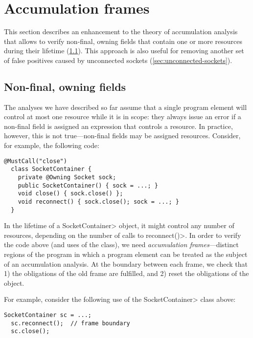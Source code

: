 \section{Accumulation frames}
\label{sec:reset-must-call}

This section describes an enhancement to the theory of accumulation
analysis that allows \tool to verify non-final, owning fields
that contain one or more resources during their lifetime
(\cref{sec:non-final-owning}).
This approach is also useful for
removing another set of false positives caused by unconnected sockets
(\cref{sec:unconnected-sockets}).

\subsection{Non-final, owning fields}
\label{sec:non-final-owning}

The analyses we have described so far assume that a single program
element will control at most one resource while it is in scope:
they always issue an error if a non-final field is assigned an expression
that controls a resource.
In practice, however, this is not true---non-final fields
may be assigned resources. Consider, for example,
the following code:

\begin{lstlisting}[frame=tb,belowskip=3mm]
  @MustCall("close")
  class SocketContainer {
    private @Owning Socket sock;
    public SocketContainer() { sock = ...; } 
    void close() { sock.close() };
    void reconnect() { sock.close(); sock = ...; }
  }
\end{lstlisting}

In the lifetime of a \<SocketContainer> object, it might control any
number of resources, depending on the number of calls to
\<reconnect()>. In order to verify the code above (and uses of the
class), we need \emph{accumulation frames}---distinct regions of the program in
which a program element can be treated as the subject of an
accumulation analysis. At the boundary between each frame, we check
that 1) the obligations of the old frame are fulfilled, and 2)
reset the obligations of the object.

For example, consider the following use of the \<SocketContainer> class
above:

\begin{lstlisting}[frame=tb,belowskip=3mm]
  SocketContainer sc = ...;
  sc.reconnect();  // frame boundary
  sc.close();
\end{lstlisting}

